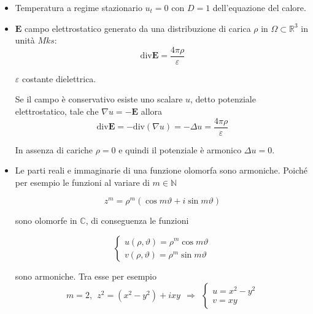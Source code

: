 \documentclass[10pt,a4paper,twoside,openright]{book}
\begin{document}
\begin{itemize}
    \item Temperatura a regime stazionario $u_{t}=0$ con $D=1$ dell'equazione del calore.
    \item $\mathbf{E}$ campo elettrostatico generato da una distribuzione di carica $\rho $ in $\Omega \subset \mathbb{R}^{3}$ in unità $Mks$:
          \begin{equation*}
              \mathrm{div}\mathbf{E} =\frac{4\pi \rho }{\varepsilon }
          \end{equation*}

          $\varepsilon $ costante dielettrica.

          Se il campo è conservativo esiste uno scalare $u$, detto potenziale elettrostatico, tale che $\nabla u=-\mathbf{E}$ allora
          \begin{equation*}
              \mathrm{div}\mathbf{E} =-\mathrm{div}(\nabla u) =-\Delta u=\frac{4\pi \rho }{\varepsilon }
          \end{equation*}

          In assenza di cariche $\rho =0$ e quindi il potenziale è armonico $\Delta u=0$.
    \item Le parti reali e immaginarie di una funzione olomorfa sono armoniche. Poiché per esempio le funzioni al variare di $m\in \mathbb{N}$

          \begin{equation*}
              z^{m} =\rho ^{m}(\cos m\vartheta +i\sin m\vartheta)
          \end{equation*}

          sono olomorfe in $\mathbb{C}$, di conseguenza le funzioni

          \begin{equation*}
              \begin{cases}
                  u(\rho,\vartheta) =\rho ^{m}\cos m\vartheta \\
                  v(\rho,\vartheta) =\rho ^{m}\sin m\vartheta
              \end{cases}
          \end{equation*}

          sono armoniche. Tra esse per esempio
          \begin{equation*}
              m=2,\ \ z^{2} =\left(x^{2} -y^{2}\right) +ixy\ \ \Rightarrow \ \ \begin{cases}
                  u=x^{2} -y^{2} \\
                  v=xy
              \end{cases}
          \end{equation*}
\end{itemize}
\end{document}

